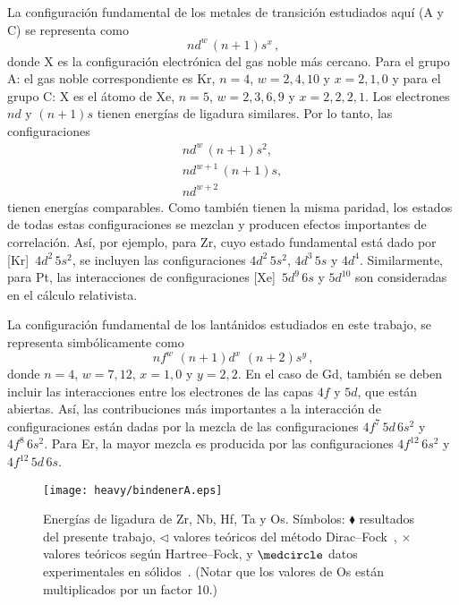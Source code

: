 La configuración fundamental de los metales de transición estudiados 
aquí (A y C) se representa como
\begin{equation}
[\text{X}]\,nd^w\,(n+1)s^x\,,
\end{equation}
donde X es la configuración electrónica del gas noble más cercano. Para 
el grupo A: el gas noble correspondiente es Kr, $n=4$, $w=2,4,10$ y 
$x=2,1,0$ y para el grupo C: X es el átomo de Xe, $n=5$, $w=2,3,6,9$ y 
$x=2,2,2,1$. Los electrones $nd$ y $(n+1)s$ tienen energías de ligadura 
similares. Por lo tanto, las configuraciones 
\begin{gather}
nd^w\,(n+1)s^2,
\label{eq:confsmtran1} \\
nd^{w+1}\,(n+1)s,
\label{eq:confsmtran2} \\
nd^{w+2}
\label{eq:confsmtran3}
\end{gather}
tienen energías comparables. Como también tienen la misma paridad, los 
estados de todas estas configuraciones se mezclan y producen efectos 
importantes de correlación. 
Así, por ejemplo, para Zr, cuyo estado fundamental está dado por 
[Kr]~$4d^2\,5s^2$, se incluyen las configuraciones $4d^2\,5s^2$, 
$4d^3\,5s$ y $4d^4$. Similarmente, para Pt, las interacciones de 
configuraciones [Xe]~$5d^9\,6s$ y $5d^{10}$ son consideradas en el 
cálculo relativista.

La configuración fundamental de los lantánidos estudiados en este 
trabajo, se representa simbólicamente como
\begin{equation}
[\text{Xe}]\,nf^w\,\,(n+1)d^x\,\,(n+2)s^y\,,
\end{equation}
donde $n=4$, $w=7,12$, $x=1,0$ y $y=2,2$. En el caso de Gd, también 
se deben incluir las interacciones entre los electrones de las capas
$4f$ y $5d$, que están abiertas. Así, las contribuciones más 
importantes a la interacción de configuraciones están dadas por la 
mezcla de las configuraciones $4f^7\,5d\,6s^2$ y $4f^8\,6s^2$.
Para Er, la mayor mezcla es producida por las configuraciones 
$4f^{12}\,6s^2$ y $4f^{12}\,5d\,6s$.

\begin{figure}
\centering
\texttt{[image: heavy/bindenerA.eps]} 
\caption[Energías de ligadura de blancos pesados]
{Energías de ligadura de Zr, Nb, Hf, Ta y Os. Símbolos: 
$\blacklozenge$ resultados del presente trabajo, 
$\triangleleft$ valores teóricos del método 
Dirac--Fock~\cite{Desclaux:73}, $\times$ valores teóricos según 
Hartree--Fock, y $\medcircle$ datos experimentales en 
sólidos~\cite{Williams:95}. (Notar que los valores de Os están 
multiplicados por un factor 10.)}
\label{fig:bindenerA}
\end{figure}

